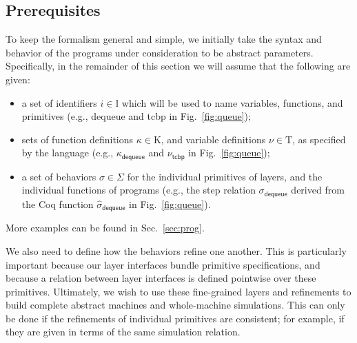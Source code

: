 \subsection{Prerequisites}

To keep the formalism general and simple,
we initially take the syntax and behavior of the programs
under consideration to be abstract parameters.
Specifically,
in the remainder of this section we will assume that
the following are given:
\begin{itemize}\itemsep 0pt %
\item a set of identifiers $i \in \mathbb{I}$
    which will be used to name variables, functions, and primitives
    (e.g., \textsf{dequeue} and \textsf{tcbp} in Fig.~\ref{fig:queue});
\item sets of function definitions $\kappa \in \mathrm{K}$, and
    variable definitions $\nu \in \mathrm{T}$,
    as specified by the language
    (e.g., $\kappa_\textsf{dequeue}$ and $\nu_\textsf{tcbp}$ in Fig.~\ref{fig:queue});
\item a set of behaviors $\sigma \in \Sigma$
    for the individual primitives of layers,
    and the individual functions of programs
    (e.g., the step relation $\sigma_\textsf{dequeue}$ 
    	derived from the Coq function 
    	$\hat{\sigma}_\textsf{dequeue}$ in Fig.~\ref{fig:queue}).
\end{itemize}
More examples can be found in Sec.~\ref{sec:prog}.

We also need to define how the behaviors
refine one another.
This is particularly important because
our layer interfaces bundle primitive specifications,
and because a relation between layer interfaces is defined pointwise
over these primitives. Ultimately, we wish to use these
fine-grained layers and refinements to build complete abstract
machines and whole-machine simulations. 
This can only be done
if the refinements of individual primitives are consistent;
for example, if they are given in terms of the same simulation relation.

